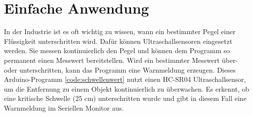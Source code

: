 








\section{Einfache Anwendung}
In der Industrie ist es oft wichtig zu wissen, wann ein bestimmter Pegel einer Flüssigkeit unterschritten wird. Dafür können Ultraschallsensoren eingesetzt werden. Sie messen kontinuierlich den Pegel und können dem Programm so permanent einen Messwert bereitstellen. Wird ein bestimmter Messwert über- oder unterschritten, kann das Programm eine Warnmeldung erzeugen.
Dieses Arduino-Programm \ref{code:schwellenwert} nutzt einen HC-SR04 Ultraschallsensor, um die Entfernung zu einem Objekt kontinuierlich zu überwachen. Es erkennt, ob eine kritische Schwelle (25 cm) unterschritten wurde und gibt in diesem Fall eine Warnmeldung im Seriellen Monitor aus.

